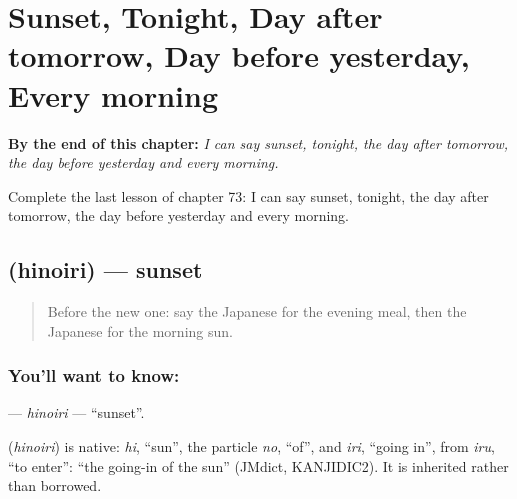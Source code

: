 
\chapter{Sunset, Tonight, Day after tomorrow, Day before yesterday, Every morning}
\label{ch:ja-sunset-tonight-day-after-tomorrow-day-before-yesterday-every-morning}

\begin{chapteropening}
\textbf{By the end of this chapter:} \emph{I can say sunset, tonight, the day after tomorrow, the day before yesterday and every morning.}

Complete the last lesson of chapter 73: I can say sunset, tonight, the day after tomorrow, the day before yesterday and every morning.
\end{chapteropening}

\section[\texorpdfstring{\ja{ひのいり} (hinoiri)}{ひのいり (hinoiri)}]{ (hinoiri) — sunset}

\label{lesson:JA-C73-hinoiri}



\begin{quote}
Before the new one: say the Japanese for the evening meal, then the Japanese for the morning sun.
\end{quote}

\subsection*{You'll want to know: }
\textbf{} — \emph{hinoiri} — \textquotedblleft{}sunset\textquotedblright{}.

\begin{cousinweb}
\textbf{} (\emph{hinoiri}) is native: \emph{hi}, \textquotedblleft{}sun\textquotedblright{}, the particle \emph{no}, \textquotedblleft{}of\textquotedblright{}, and \emph{iri}, \textquotedblleft{}going in\textquotedblright{}, from \emph{iru}, \textquotedblleft{}to enter\textquotedblright{}: \textquotedblleft{}the going-in of the sun\textquotedblright{} (JMdict, KANJIDIC2). It is inherited rather than borrowed.
\end{cousinweb}

